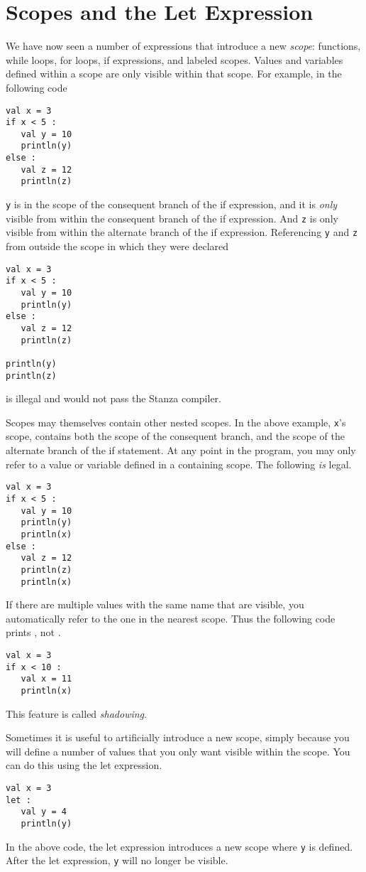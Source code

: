 \documentclass[10pt,oneside]{book}
\begin{document}
\section{Scopes and the Let Expression}
We have now seen a number of expressions that introduce a new {\em scope}: functions, while loops, for loops, if expressions, and labeled scopes. Values and variables defined within a scope are only visible within that scope. For example, in the following code
\begin{lstlisting}
val x = 3
if x < 5 :
   val y = 10
   println(y)
else :
   val z = 12
   println(z)
\end{lstlisting}
\texttt{\frenchspacing y} is in the scope of the consequent branch of the if expression, and it is {\em only} visible from within the consequent branch of the if expression. And \texttt{\frenchspacing z} is only visible from within the alternate branch of the if expression. Referencing \texttt{\frenchspacing y} and \texttt{\frenchspacing z} from outside the scope in which they were declared
\begin{lstlisting}
val x = 3
if x < 5 :
   val y = 10
   println(y)
else :
   val z = 12
   println(z)
   
println(y)
println(z)
\end{lstlisting}
is illegal and would not pass the Stanza compiler. 

Scopes may themselves contain other nested scopes. In the above example, \texttt{\frenchspacing x}'s scope, contains both the scope of the consequent branch, and the scope of the alternate branch of the if statement. At any point in the program, you may only refer to a value or variable defined in a containing scope. The following {\em is} legal.
\begin{lstlisting}
val x = 3
if x < 5 :
   val y = 10
   println(y)
   println(x)
else :
   val z = 12
   println(z)
   println(x)
\end{lstlisting}

If there are multiple values with the same name that are visible, you automatically refer to the one in the nearest scope. Thus the following code prints \texttt{}, not \texttt{}. 
\begin{lstlisting}
val x = 3
if x < 10 :
   val x = 11
   println(x)
\end{lstlisting}
This feature is called {\em shadowing}.

Sometimes it is useful to artificially introduce a new scope, simply because you will define a number of values that you only want visible within the scope. You can do this using the let expression.
\begin{lstlisting}
val x = 3
let :
   val y = 4
   println(y)
\end{lstlisting}
In the above code, the let expression introduces a new scope where \texttt{\frenchspacing y} is defined. After the let expression, \texttt{\frenchspacing y} will no longer be visible. 
\end{document}

